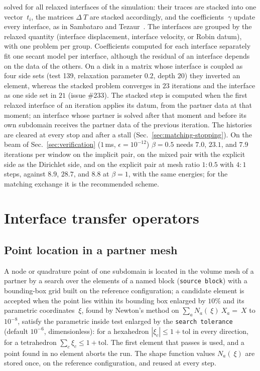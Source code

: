 \documentclass[11pt]{article}
\newcommand{\code}[1]{\texttt{#1}}
\begin{document}
solved for all relaxed interfaces of the simulation: their traces are
stacked into one vector $~t_i$, the matrices $\Delta ~T$ are stacked
accordingly, and the coefficients $~\gamma$ update every interface, as in
Sambataro and Tezaur~\cite{SambataroTezaurAnderson}. The interfaces are grouped by the relaxed quantity
(interface displacement, interface velocity, or Robin datum), with one
problem per group. Coefficients computed for each interface separately fit
one secant model per interface, although the residual of an interface
depends on the data of the others. On a disk in a matrix whose interface
is coupled as four side sets (test 139, relaxation parameter $0.2$,
depth $20$) they inverted an element, whereas the stacked problem
converges in $23$ iterations and the interface as one side set in $21$
(issue \#233). The stacked step is computed when the first relaxed
interface of an iteration applies its datum, from the partner data at that
moment; an interface whose partner is solved after that moment and before
its own subdomain receives the partner data of the previous iteration. The
histories are cleared at every stop and after a stall
(Sec.~\ref{sec:matching-stopping}).
On the beam of Sec.~\ref{sec:verification} ($1$\,ms, $\epsilon = 10^{-12}$)
$\beta = 0.5$ needs $7.0$, $23.1$, and $7.9$ iterations per window on the
implicit pair, on the mixed pair with the explicit side as the Dirichlet
side, and on the explicit pair at mesh ratio $1{:}0.5$ with $4{:}1$ steps,
against $8.9$, $28.7$, and $8.8$ at $\beta = 1$, with the same energies;
for the matching exchange it is the recommended scheme.

\section{Interface transfer operators}
\label{sec:transfer}

\subsection{Point location in a partner mesh}
\label{sec:location}

A node or quadrature point of one subdomain is located in the volume mesh
of a partner by a search over the elements of a named block
(\code{source block}) with a bounding-box grid built on the reference
configuration; a candidate element is accepted when the point lies within
its bounding box enlarged by $10\%$ and its parametric coordinates
$~\xi$, found by Newton's method on $\sum_a N_a(~\xi) ~X_a = ~X$ to
$10^{-8}$, satisfy the parametric inside test enlarged by the
\code{search tolerance} (default $10^{-6}$, dimensionless): for a
hexahedron $|\xi_c| \le 1 + \mathrm{tol}$ in every direction, for a
tetrahedron $\sum_c \xi_c \le 1 + \mathrm{tol}$. The first element that
passes is used, and a point found in no element aborts the run. The shape
function values $N_a(~\xi)$ are stored once, on the reference
configuration, and reused at every step.
\end{document}
